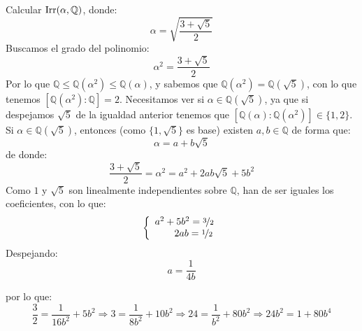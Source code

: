 \begin{ejercicio}
    Calcular $\operatorname{Irr}(\alpha,\mathbb{Q})$, donde:
    \begin{equation*}
        \alpha = \sqrt{\frac{3+\sqrt{5}}{2}}
    \end{equation*}
    Buscamos el grado del polinomio:
    \begin{equation*}
        \alpha^2 = \frac{3+\sqrt{5}}{2}
    \end{equation*}
    Por lo que $\mathbb{Q} \leq\mathbb{Q}(\alpha^2)\leq \mathbb{Q}(\alpha)$, y sabemos que $\mathbb{Q}(\alpha^2)=\mathbb{Q}\left(\sqrt{5}\right)$, con lo que tenemos $[\mathbb{Q}(\alpha^2):\mathbb{Q}] = 2$. Necesitamos ver si $\alpha\in \mathbb{Q}\left(\sqrt{5}\right)$, ya que si despejamos $\sqrt{5}$ de la igualdad anterior tenemos que $[\mathbb{Q}(\alpha):\mathbb{Q}(\alpha^2)]\in \{1,2\}$.\\

    \noindent
    Si $\alpha\in \mathbb{Q}(\sqrt{5})$, entonces (como $\{1,\sqrt{5}\}$ es base) existen $a,b\in \mathbb{Q}$ de forma que:
    \begin{equation*}
        \alpha = a + b\sqrt{5}
    \end{equation*}
    de donde:
    \begin{equation*}
        \frac{3+\sqrt{5}}{2} = \alpha^2 = a^2 + 2ab\sqrt{5} + 5b^2
    \end{equation*}
    Como $1$ y $\sqrt{5}$ son linealmente independientes sobre $\mathbb{Q}$, han de ser iguales los coeficientes, con lo que:
    \begin{equation*}
        \left\{\begin{array}{l}
            a^2 + 5b^2 = \nicefrac{3}{2}\\ \qquad 2ab = \nicefrac{1}{2} 
        \end{array}\right.
    \end{equation*}
    Despejando:
    \begin{equation*}
        a = \frac{1}{4b}
    \end{equation*}

    por lo que:
    \begin{equation*}
        \frac{3}{2} = \frac{1}{16b^2} + 5b^2 \Longrightarrow 3 = \frac{1}{8b^2} + 10b^2 \Longrightarrow 24 = \frac{1}{b^2} + 80b^2 \Longrightarrow 24b^2 = 1 + 80b^4
    \end{equation*}


\end{ejercicio}
